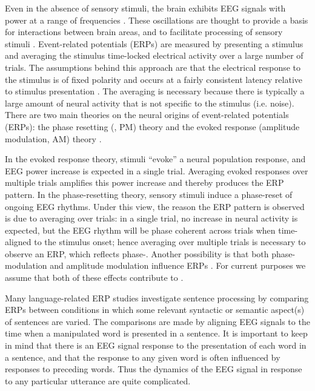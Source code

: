 Even in the absence of sensory stimuli, the brain exhibits EEG signals with power at a range of frequencies \citep{Buzsaki2006}. These oscillations are thought to provide a basis for interactions between brain areas, and to facilitate processing of sensory stimuli \citep{FriesEtAl2001,GrayEtAl1989}. Event-related potentials (ERPs) are measured by presenting a stimulus and averaging the stimulus time-locked electrical activity over a large number of trials. The assumptions behind this approach are that the electrical response to the stimulus is of fixed polarity and occurs at a fairly consistent latency relative to stimulus presentation \citep{PennyEtAl2002}. The averaging is necessary because there is typically a large amount of neural activity that is not specific to the stimulus (i.e. noise). There are two main theories on the neural origins of event-related potentials (ERPs): the phase resetting (, PM) theory and the evoked response (amplitude modulation, AM) theory \citep{MakeigEtAl2002,PennyEtAl2002,ShahEtAl2004}.

In the evoked response theory, stimuli “evoke” a neural population response, and EEG power increase is expected in a single trial. Averaging evoked responses over multiple trials amplifies this power increase and thereby produces the ERP pattern. In the phase-resetting theory, sensory stimuli induce a phase-reset of ongoing EEG rhythms. Under this view, the reason the ERP pattern is observed is due to averaging over trials: in a single trial, no increase in neural activity is expected, but the EEG rhythm will be phase coherent across trials when time-aligned to the stimulus onset; hence averaging over multiple trials is necessary to observe an ERP, which reflects phase-. Another possibility is that both phase-modulation and amplitude modulation influence ERPs \citep{PennyEtAl2002,ShahEtAl2004}. For current purposes we assume that both of these effects contribute to . 

  Many language-related ERP studies investigate sentence processing by comparing ERPs between conditions in which some relevant syntactic or semantic aspect(s) of sentences are varied. The comparisons are made by aligning EEG signals to the time when a manipulated word is presented in a sentence. It is important to keep in mind that there is an EEG signal response to the presentation of each word in a sentence, and that the response to any given word is often influenced by responses to preceding words. Thus the dynamics of the EEG signal in response to any particular utterance are quite complicated. 

